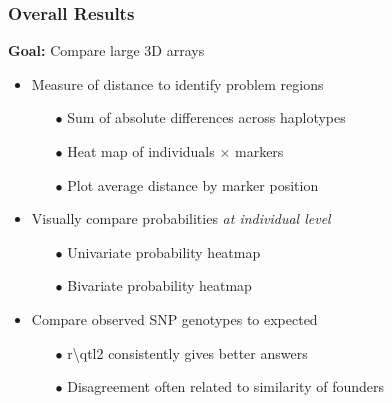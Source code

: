 \documentclass[12pt,t]{beamer}
\begin{document}
	\begin{frame}
		\frametitle{Overall Results}				
			\pause \textbf{Goal:} Compare large 3D arrays \newline
			\begin{itemize}
				\pause \item Measure of distance to identify problem regions\\
					\begin{itemize}
						\pause \item[$\bullet$] Sum of absolute differences across haplotypes \\
						\pause \item[$\bullet$] Heat map of individuals $\times$ markers \\
						\pause \item[$\bullet$] Plot average distance by marker position \\
					\end{itemize}
				\pause \item Visually compare probabilities \textit{at individual level} \\
					\begin{itemize}
						\pause \item[$\bullet$] Univariate probability heatmap \\
						\pause \item[$\bullet$] Bivariate probability heatmap \\
					\end{itemize}
				\pause \item Compare observed SNP genotypes to expected \\
					\begin{itemize}
						\pause \item[$\bullet$] r\textbackslash qtl2 consistently gives better answers \\
						\pause \item[$\bullet$] Disagreement often related to similarity of founders \\
					\end{itemize}
			\end{itemize}
	\end{frame}
	
	
\end{document}
